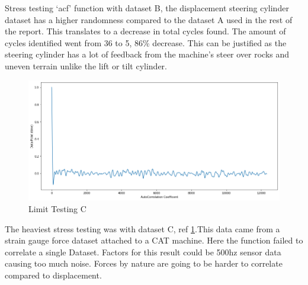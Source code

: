Stress testing `acf' function with dataset B, the displacement steering cylinder dataset has a higher randomness compared to the dataset A used in the rest of the report. This translates to a decrease in total cycles found. The amount of cycles identified went from 36 to 5, 86\% decrease. 
This can be justified as the steering cylinder has a lot of feedback from the machine's steer over rocks and uneven terrain unlike the lift or tilt cylinder.

\begin{figure}[ht]
\centering
\includegraphics[scale=0.40]{images/limitTestB.png}
\caption{Limit Testing C }
\label{LimitB}
\end{figure}
The heaviest stress testing was with dataset C, ref \ref{LimitB}.This data came from a strain gauge force dataset attached to a CAT machine. Here the function failed to correlate a single Dataset. Factors for this result could be 500hz sensor data causing too much noise. Forces by nature are going to be harder to correlate compared to displacement. 
